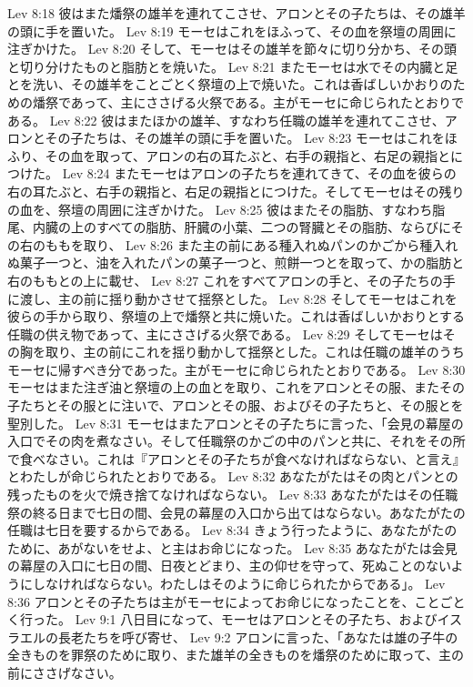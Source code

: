 Lev 8:18  彼はまた燔祭の雄羊を連れてこさせ、アロンとその子たちは、その雄羊の頭に手を置いた。
Lev 8:19  モーセはこれをほふって、その血を祭壇の周囲に注ぎかけた。
Lev 8:20  そして、モーセはその雄羊を節々に切り分かち、その頭と切り分けたものと脂肪とを焼いた。
Lev 8:21  またモーセは水でその内臓と足とを洗い、その雄羊をことごとく祭壇の上で焼いた。これは香ばしいかおりのための燔祭であって、主にささげる火祭である。主がモーセに命じられたとおりである。
Lev 8:22  彼はまたほかの雄羊、すなわち任職の雄羊を連れてこさせ、アロンとその子たちは、その雄羊の頭に手を置いた。
Lev 8:23  モーセはこれをほふり、その血を取って、アロンの右の耳たぶと、右手の親指と、右足の親指とにつけた。
Lev 8:24  またモーセはアロンの子たちを連れてきて、その血を彼らの右の耳たぶと、右手の親指と、右足の親指とにつけた。そしてモーセはその残りの血を、祭壇の周囲に注ぎかけた。
Lev 8:25  彼はまたその脂肪、すなわち脂尾、内臓の上のすべての脂肪、肝臓の小葉、二つの腎臓とその脂肪、ならびにその右のももを取り、
Lev 8:26  また主の前にある種入れぬパンのかごから種入れぬ菓子一つと、油を入れたパンの菓子一つと、煎餅一つとを取って、かの脂肪と右のももとの上に載せ、
Lev 8:27  これをすべてアロンの手と、その子たちの手に渡し、主の前に揺り動かさせて揺祭とした。
Lev 8:28  そしてモーセはこれを彼らの手から取り、祭壇の上で燔祭と共に焼いた。これは香ばしいかおりとする任職の供え物であって、主にささげる火祭である。
Lev 8:29  そしてモーセはその胸を取り、主の前にこれを揺り動かして揺祭とした。これは任職の雄羊のうちモーセに帰すべき分であった。主がモーセに命じられたとおりである。
Lev 8:30  モーセはまた注ぎ油と祭壇の上の血とを取り、これをアロンとその服、またその子たちとその服とに注いで、アロンとその服、およびその子たちと、その服とを聖別した。
Lev 8:31  モーセはまたアロンとその子たちに言った、「会見の幕屋の入口でその肉を煮なさい。そして任職祭のかごの中のパンと共に、それをその所で食べなさい。これは『アロンとその子たちが食べなければならない、と言え』とわたしが命じられたとおりである。
Lev 8:32  あなたがたはその肉とパンとの残ったものを火で焼き捨てなければならない。
Lev 8:33  あなたがたはその任職祭の終る日まで七日の間、会見の幕屋の入口から出てはならない。あなたがたの任職は七日を要するからである。
Lev 8:34  きょう行ったように、あなたがたのために、あがないをせよ、と主はお命じになった。
Lev 8:35  あなたがたは会見の幕屋の入口に七日の間、日夜とどまり、主の仰せを守って、死ぬことのないようにしなければならない。わたしはそのように命じられたからである」。
Lev 8:36  アロンとその子たちは主がモーセによってお命じになったことを、ことごとく行った。
Lev 9:1  八日目になって、モーセはアロンとその子たち、およびイスラエルの長老たちを呼び寄せ、
Lev 9:2  アロンに言った、「あなたは雄の子牛の全きものを罪祭のために取り、また雄羊の全きものを燔祭のために取って、主の前にささげなさい。
